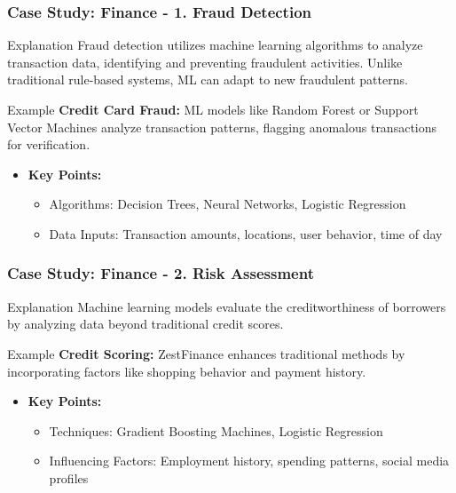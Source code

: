 \documentclass[aspectratio=169]{beamer}
\begin{document}
\begin{frame}
    \frametitle{Case Study: Finance - 1. Fraud Detection}
    \begin{block}{Explanation}
        Fraud detection utilizes machine learning algorithms to analyze transaction data, identifying and preventing fraudulent activities. Unlike traditional rule-based systems, ML can adapt to new fraudulent patterns.
    \end{block}
    
    \begin{block}{Example}
        \textbf{Credit Card Fraud:} ML models like Random Forest or Support Vector Machines analyze transaction patterns, flagging anomalous transactions for verification.
    \end{block}
    
    \begin{itemize}
        \item \textbf{Key Points:}
        \begin{itemize}
            \item Algorithms: Decision Trees, Neural Networks, Logistic Regression
            \item Data Inputs: Transaction amounts, locations, user behavior, time of day
        \end{itemize}
    \end{itemize}
\end{frame}

\begin{frame}
    \frametitle{Case Study: Finance - 2. Risk Assessment}
    \begin{block}{Explanation}
        Machine learning models evaluate the creditworthiness of borrowers by analyzing data beyond traditional credit scores.
    \end{block}
    
    \begin{block}{Example}
        \textbf{Credit Scoring:} ZestFinance enhances traditional methods by incorporating factors like shopping behavior and payment history.
    \end{block}
    
    \begin{itemize}
        \item \textbf{Key Points:}
        \begin{itemize}
            \item Techniques: Gradient Boosting Machines, Logistic Regression
            \item Influencing Factors: Employment history, spending patterns, social media profiles
        \end{itemize}
    \end{itemize}
\end{frame}
\end{document}
